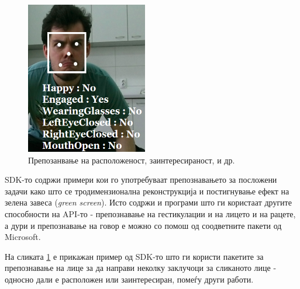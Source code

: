 \documentclass[11pt]{article}
\begin{document}
\begin{figure}[h]
\begin{minipage}{0.3\linewidth}
        \includegraphics[width = \textwidth]{./images/happy_no_small.png}
        \caption{Препозанвање на расположеност, заинтересираност, и др.}
        \label{fig:happy_no}
      \end{minipage}
    \end{figure}


    SDK-то содржи примери кои го употребуваат препознавањето за посложени задачи како што се тродимензионална реконструкција и постигнување ефект на зелена завеса (\textit{green screen}). Исто содржи и програми што ги користаат другите способности на API-то - препознавање на гестикулации и на лицето и на рацете, а дури и препознавање на говор е можно со помош од соодветните пакети од Microsoft.

    На сликата \ref{fig:happy_no} е прикажан пример од SDK-то што ги користи пакетите за препознавање на лице за да направи неколку заклучоци за сликаното лице - односно дали е расположен или заинтересиран, помеѓу други работи.

    \bigbreak
\end{document}
